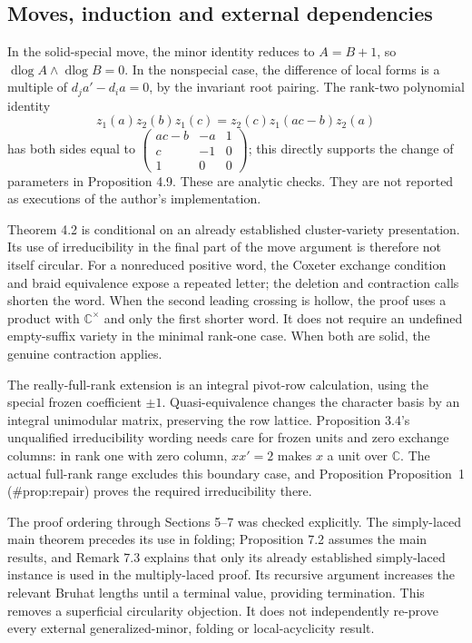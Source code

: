 \documentclass[10pt]{article}
\begin{document}
\subsection*{Moves, induction and external dependencies}
In the solid-special move, the minor identity reduces to \(A=B+1\), so \(\operatorname{dlog}A\wedge\operatorname{dlog}B=0\). In the nonspecial case, the difference of local forms is a multiple of \(d_j a'-d_i a=0\), by the invariant root pairing. The rank-two polynomial identity \[z_1(a)z_2(b)z_1(c)=z_2(c)z_1(ac-b)z_2(a)\] has both sides equal to \(\left(\begin{smallmatrix}ac-b&-a&1\\c&-1&0\\1&0&0\end{smallmatrix}\right)\); this directly supports the change of parameters in Proposition 4.9. These are analytic checks. They are not reported as executions of the author’s implementation.\par
Theorem 4.2 is conditional on an already established cluster-variety presentation. Its use of irreducibility in the final part of the move argument is therefore not itself circular. For a nonreduced positive word, the Coxeter exchange condition and braid equivalence expose a repeated letter; the deletion and contraction calls shorten the word. When the second leading crossing is hollow, the proof uses a product with \(\mathbb C^\times\) and only the first shorter word. It does not require an undefined empty-suffix variety in the minimal rank-one case. When both are solid, the genuine contraction applies.\par
The really-full-rank extension is an integral pivot-row calculation, using the special frozen coefficient \(\pm1\). Quasi-equivalence changes the character basis by an integral unimodular matrix, preserving the row lattice. Proposition 3.4’s unqualified irreducibility wording needs care for frozen units and zero exchange columns: in rank one with zero column, \(xx'=2\) makes \(x\) a unit over \(\mathbb C\). The actual full-rank range excludes this boundary case, and Proposition Proposition 1 (\#prop:repair) proves the required irreducibility there.\par
The proof ordering through Sections 5–7 was checked explicitly. The simply-laced main theorem precedes its use in folding; Proposition 7.2 assumes the main results, and Remark 7.3 explains that only its already established simply-laced instance is used in the multiply-laced proof. Its recursive argument increases the relevant Bruhat lengths until a terminal value, providing termination. This removes a superficial circularity objection. It does not independently re-prove every external generalized-minor, folding or local-acyclicity result.\par
\end{document}
